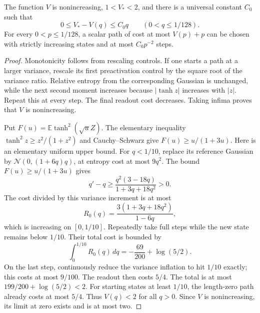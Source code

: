 \begin{lemma}
\label{lem:scalar-value-properties}
The function $V$ is nonincreasing, $1<V_*<2$, and there is a
universal constant $C_0$ such that
\[
 0\le V_*-V(q)\le C_0q\qquad(0<q\le1/128).
\]
For every $0<p\le1/128$, a scalar path of cost at most $V(p)+p$ can
be chosen with strictly increasing states and at most $C_0p^{-2}$ steps.
\end{lemma}

\begin{proof}
Monotonicity follows from rescaling controls. If one starts a path at a
larger variance, rescale its first preactivation control by the square
root of the variance ratio. Relative entropy from the corresponding
Gaussian is unchanged, while the next second moment increases because
$|\tanh z|$ increases with $|z|$. Repeat this at every step. The final
readout cost decreases. Taking infima proves that $V$ is nonincreasing.

Put $F(u)=\mathbb E\tanh^2(\sqrt uZ)$. The elementary inequality
$\tanh^2z\ge z^2/(1+z^2)$ and Cauchy--Schwarz give
$F(u)\ge u/(1+3u)$.
Here is an elementary uniform upper bound. For $q<1/10$, replace its
reference Gaussian by $\mathcal N(0,(1+6q)q)$, at entropy cost at most
$9q^2$. The bound $F(u)\ge u/(1+3u)$ gives
\[
 q'-q\ge\frac{q^2(3-18q)}{1+3q+18q^2}>0.
\]
The cost divided by this variance increment is at most
\[
 R_0(q)=\frac{3(1+3q+18q^2)}{1-6q},
\]
which is increasing on $[0,1/10]$. Repeatedly take full steps while the
new state remains below $1/10$. Their total cost is bounded by
\[
 \int_0^{1/10}R_0(q)\,dq=-\frac{69}{200}+\log(5/2).
\]
On the last step, continuously reduce the variance inflation to hit
$1/10$ exactly; this costs at most $9/100$. The readout then costs
$5/4$. The total is at most $199/200+\log(5/2)<2$.
For starting states at least $1/10$, the length-zero path already costs
at most $5/4$. Thus $V(q)<2$ for all $q>0$.
Since $V$ is nonincreasing, its limit at zero exists and is at most two.


\end{proof}
